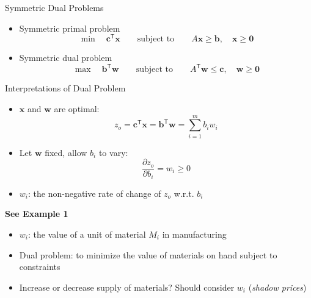 \documentclass[aspectratio=169,hyperref,UTF8,CJK]{beamer}
\newcommand{\trans}{\mathsf{T}}
\newcommand{\vect}[1]{\boldsymbol{#1}}
\begin{document}
\begin{frame}{Symmetric Dual Problems}
  \begin{itemize}
    \item Symmetric primal problem
      \begin{equation*}
        \min\quad \vect{c}^{\trans}\vect{x}
        \qquad\text{subject to}\qquad
        A\vect{x}\ge\vect{b},\quad \vect{x}\ge\vect{0}
      \end{equation*}
    \item Symmetric dual problem
      \begin{equation*}
        \max\quad \vect{b}^{\trans}\vect{w}
        \qquad\text{subject to}\qquad
        A^{\trans}\vect{w}\le\vect{c},\quad \vect{w}\ge\vect{0}
      \end{equation*}
  \end{itemize}
\end{frame}

\begin{frame}{Interpretations of Dual Problem}
  \small
  \begin{itemize}
    \item $\vect{x}$ and $\vect{w}$ are optimal:
      \begin{equation*}
        z_o=\vect{c}^{\trans}\vect{x}=\vect{b}^{\trans}\vect{w}=\sum_{i=1}^{m}b_iw_i
      \end{equation*}
    \item Let $\vect{w}$ fixed, allow $b_i$ to vary:
      \begin{equation*}
        \frac{\partial z_o}{\partial b_i}=w_i\ge0
      \end{equation*}
    \item $w_i$: the non-negative rate of change of $z_o$ w.r.t. $b_i$
  \end{itemize}
  \textbf{See Example 1}
  \begin{itemize}
    \item[$\triangle$] $w_i$: the value of a unit of material $M_i$ in manufacturing
    \item[$\triangle$] Dual problem: to minimize the value of materials on hand subject to constraints
    \item[$\triangle$] Increase or decrease supply of materials? Should consider $w_i$ (\emph{shadow prices})
  \end{itemize}
\end{frame}
\end{document}
